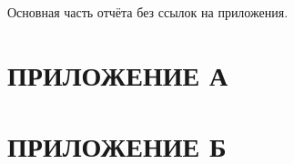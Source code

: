 

Основная часть отчёта без ссылок на приложения.

\section*{ПРИЛОЖЕНИЕ А} %

\section*{ПРИЛОЖЕНИЕ Б} %


